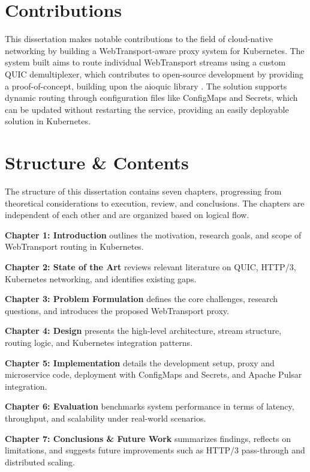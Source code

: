 \section{Contributions}

This dissertation makes notable contributions to the field of cloud-native networking by building a WebTransport-aware proxy system for Kubernetes. The system built aims to route individual WebTransport streams using a custom QUIC demultiplexer, which contributes to open-source development by providing a proof-of-concept, building upon the aioquic library \cite{aioquic-repo}. The solution supports dynamic routing through configuration files like ConfigMaps and Secrets, which can be updated without restarting the service, providing an easily deployable solution in Kubernetes.


\section{Structure \& Contents}

The structure of this dissertation contains seven chapters, progressing from theoretical considerations to execution, review, and conclusions. The chapters are independent of each other and are organized based on logical flow.

\textbf{Chapter 1: Introduction} outlines the motivation, research goals, and scope of WebTransport routing in Kubernetes.

\textbf{Chapter 2: State of the Art} reviews relevant literature on QUIC, HTTP/3, Kubernetes networking, and identifies existing gaps.

\textbf{Chapter 3: Problem Formulation} defines the core challenges, research questions, and introduces the proposed WebTransport proxy.

\textbf{Chapter 4: Design} presents the high-level architecture, stream structure, routing logic, and Kubernetes integration patterns.

\textbf{Chapter 5: Implementation} details the development setup, proxy and microservice code, deployment with ConfigMaps and Secrets, and Apache Pulsar integration.

\textbf{Chapter 6: Evaluation} benchmarks system performance in terms of latency, throughput, and scalability under real-world scenarios.

\textbf{Chapter 7: Conclusions \& Future Work} summarizes findings, reflects on limitations, and suggests future improvements such as HTTP/3 pass-through and distributed scaling.

